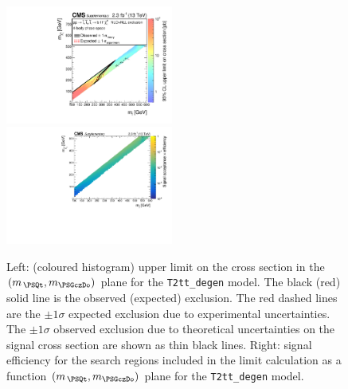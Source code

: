 \clearpage
\begin{figure}[!h]
  \begin{center}
    \includegraphics[width=0.49\textwidth]{Supplementary/RA1T2-4bdXSEC_aux} \, 
    \includegraphics[width=0.49\textwidth]{Supplementary/T2-4bd_merging_4_cats_aux} \,     
  \end{center}
  \caption{Left: (coloured histogram) upper limit on the cross section in the $(m_{\,\PSQt}, m_{\PSGczDo})$ plane for the \texttt{T2tt\_degen} model. 
  The black (red) solid line is the observed (expected) exclusion. The red dashed lines are the $\pm1\sigma$ expected exclusion due to experimental uncertainties. 
  The $\pm1\sigma$ observed exclusion due to theoretical uncertainties on the signal cross section are shown as thin black lines. 
  Right: signal efficiency for the search regions included in the limit calculation as a function $(m_{\,\PSQt}, m_{\PSGczDo})$ plane for the \texttt{T2tt\_degen} model. 
  \label{fig:T2-4bd_excl}}
\end{figure}


